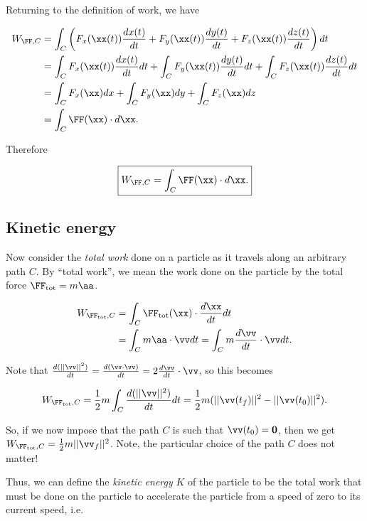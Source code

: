 \documentclass{article}
\begin{document}
Returning to the definition of work, we have

\begin{align*}
    W_{\FF, C} &= \int_C \left( F_x(\xx(t)) \frac{dx(t)}{dt} + F_y(\xx(t)) \frac{dy(t)}{d t} + F_z(\xx(t)) \frac{d z(t)}{dt} \right) dt \\
    &= \int_C F_x(\xx(t)) \frac{d x(t)}{d t} d t + \int_C F_y(\xx(t)) \frac{d y(t)}{d t} d t + \int_C F_z(\xx(t)) \frac{d z(t)}{d t} d t \\
    &= \int_C F_x(\xx) d x + \int_C F_y(\xx) d y + \int_C F_z(\xx) dz \\
    &= \int_C \FF(\xx) \cdot d \xx.
\end{align*}

Therefore 

\begin{align*}
    \boxed
    {
        W_{\FF, C} = \int_C \FF(\xx) \cdot d \xx.
    }
\end{align*}

\subsection*{Kinetic energy}

Now consider the \textit{total work} done on a particle as it travels along an arbitrary path $C$. By ``total work'', we mean the work done on the particle by the total force $\FF_{\text{tot}} = m \aa$.

\begin{align*}
    W_{\FF_{\text{tot}}, C} &= \int_C \FF_{\text{tot}}(\xx) \cdot \frac{d \xx}{d t} d t \\
    &= \int_C m \aa \cdot \vv d t = \int_C m \frac{d \vv}{d t} \cdot \vv d t.
\end{align*}

Note that $\frac{d(||\vv||^2)}{dt} = \frac{d(\vv \cdot \vv)}{dt} = 2 \frac{d\vv}{dt} \cdot \vv$, so this becomes

\begin{align*}
    W_{\FF_{\text{tot}}, C} = \frac{1}{2} m \int_C \frac{d(||\vv||^2)}{dt} dt = \frac{1}{2} m (||\vv(t_f)||^2 - ||\vv(t_0)||^2).
\end{align*}

So, if we now impose that the path $C$ is such that $\vv(t_0) = \mathbf{0}$, then we get $W_{\FF_{\text{tot}}, C} = \frac{1}{2}m||\vv_f||^2$. Note, the particular choice of the path $C$ does not matter!

Thus, we can define the \textit{kinetic energy} $K$ of the particle to be the total work that must be done on the particle to accelerate the particle from a speed of zero to its current speed, i.e.
\end{document}
